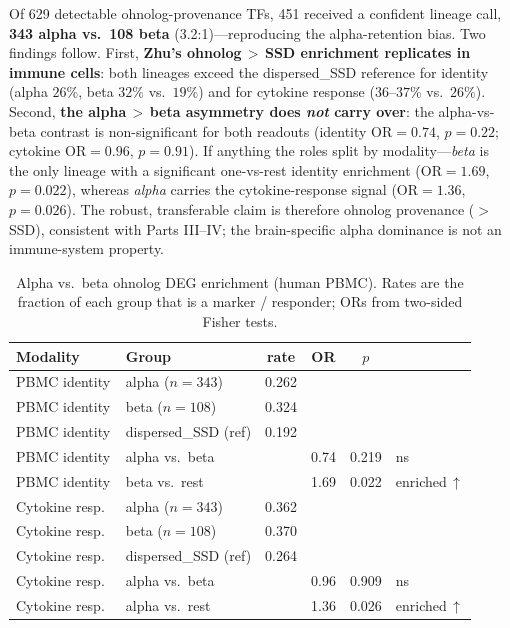 \documentclass[11pt]{article}
\newcommand{\dispssd}{\textcolor{ssd}{dispersed\_SSD}}
\begin{document}
Of 629 detectable ohnolog-provenance TFs, 451 received a confident lineage call,
\textbf{343 alpha vs.\ 108 beta} (3.2:1)---reproducing the alpha-retention bias. Two findings
follow. First, \textbf{Zhu's ohnolog\,$>$\,SSD enrichment replicates in immune cells}: both
lineages exceed the \dispssd{} reference for identity (alpha $26\%$, beta $32\%$ vs.\ $19\%$)
and for cytokine response ($36$--$37\%$ vs.\ $26\%$). Second, \textbf{the alpha\,$>$\,beta
asymmetry does \emph{not} carry over}: the alpha-vs-beta contrast is non-significant for both
readouts (identity OR$=0.74$, $p=0.22$; cytokine OR$=0.96$, $p=0.91$). If anything the roles
split by modality---\emph{beta} is the only lineage with a significant one-vs-rest identity
enrichment (OR$=1.69$, $p=0.022$), whereas \emph{alpha} carries the cytokine-response signal
(OR$=1.36$, $p=0.026$). The robust, transferable claim is therefore ohnolog provenance
($>$\,SSD), consistent with Parts III--IV; the brain-specific alpha dominance is not an
immune-system property.

\begin{table}[h]
\centering
\footnotesize
\setlength{\tabcolsep}{5pt}
\caption{Alpha vs.\ beta ohnolog DEG enrichment (human PBMC). Rates are the fraction of each
group that is a marker / responder; ORs from two-sided Fisher tests.}
\label{tab:alphabeta}
\begin{tabular}{llS[table-format=1.3]S[table-format=1.2]S[table-format=1.3]l}
\toprule
\textbf{Modality} & \textbf{Group} & {\textbf{rate}} & {\textbf{OR}} & {\textbf{$p$}} & \textbf{} \\
\midrule
PBMC identity & alpha ($n{=}343$)        & 0.262 & {} & {} & \\
PBMC identity & beta ($n{=}108$)         & 0.324 & {} & {} & \\
PBMC identity & \dispssd{} (ref)         & 0.192 & {} & {} & \\
PBMC identity & alpha vs.\ beta          & {} & 0.74 & 0.219 & ns \\
PBMC identity & beta vs.\ rest           & {} & 1.69 & 0.022 & enriched\,$\uparrow$ \\
\midrule
Cytokine resp.\ & alpha ($n{=}343$)      & 0.362 & {} & {} & \\
Cytokine resp.\ & beta ($n{=}108$)       & 0.370 & {} & {} & \\
Cytokine resp.\ & \dispssd{} (ref)       & 0.264 & {} & {} & \\
Cytokine resp.\ & alpha vs.\ beta        & {} & 0.96 & 0.909 & ns \\
Cytokine resp.\ & alpha vs.\ rest        & {} & 1.36 & 0.026 & enriched\,$\uparrow$ \\
\bottomrule
\end{tabular}
\end{table}
\end{document}
